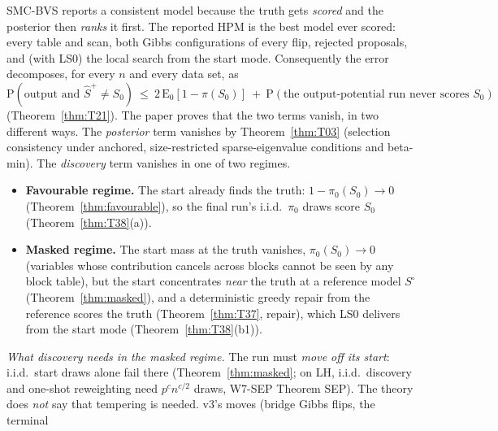 \documentclass[11pt]{article}
\theoremstyle{definition}
\theoremstyle{remark}
\renewcommand{\Pr}{\mathrm{P}}
\newcommand{\E}{\mathrm{E}}
\newcommand{\Sz}{S_0}
\newcommand{\Spl}{\widehat S^{+}}
\begin{document}
SMC-BVS reports a consistent model because the truth gets \emph{scored} and the posterior then \emph{ranks} it first.
The reported HPM is the best model ever scored: every table and scan, both Gibbs configurations of every flip,
rejected proposals, and (with LS0) the local search from the start mode. Consequently the error decomposes, for every
$n$ and every data set, as
\begin{equation}\label{eq:story}
\Pr(\text{output and }\Spl\ne\Sz)\ \le\ 2\,\E_0[1-\pi(\Sz)]\ +\ \Pr(\text{the output-potential run never scores }\Sz)
\end{equation}
(Theorem~\ref{thm:T21}). The paper proves that the two terms vanish, in two different ways.
The \emph{posterior} term vanishes by Theorem~\ref{thm:T03} (selection consistency under anchored, size-restricted
sparse-eigenvalue conditions and beta-min). The \emph{discovery} term vanishes in one of two regimes.
\begin{itemize}
\item \textbf{Favourable regime.} The start already finds the truth: $1-\pi_0(\Sz)\to0$ (Theorem~\ref{thm:favourable}), so the final run's i.i.d.\ $\pi_0$ draws score $\Sz$ (Theorem~\ref{thm:T38}(a)).
\item \textbf{Masked regime.} The start mass at the truth vanishes, $\pi_0(\Sz)\to0$ (variables whose contribution
cancels across blocks cannot be seen by any block table), but the start concentrates \emph{near} the truth at a
reference model $S^\circ$ (Theorem~\ref{thm:masked}), and a deterministic greedy repair from the reference
scores the truth (Theorem~\ref{thm:T37}, repair), which LS0 delivers from the start mode (Theorem~\ref{thm:T38}(b1)).
\end{itemize}
\noindent\emph{What discovery needs in the masked regime.} The run must \emph{move off its start}: i.i.d.\ start draws alone
fail there (Theorem~\ref{thm:masked}; on LH, i.i.d.\ discovery and one-shot reweighting need $p^cn^{c/2}$ draws, W7-SEP
Theorem SEP). The theory does \emph{not} say that tempering is needed. v3's moves (bridge Gibbs flips, the terminal
\end{document}
